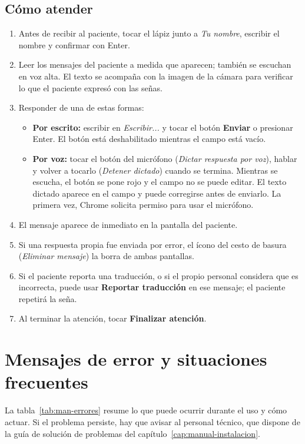 \subsection{Cómo atender}

\begin{enumerate}
  \item Antes de recibir al paciente, tocar el lápiz junto a \emph{Tu nombre}, escribir el nombre y confirmar con Enter.
  \item Leer los mensajes del paciente a medida que aparecen; también se escuchan en voz alta. El texto se acompaña con la imagen de la cámara para verificar lo que el paciente expresó con las señas.
  \item Responder de una de estas formas:
  \begin{itemize}
    \item \textbf{Por escrito:} escribir en \emph{Escribir...} y tocar el botón \textbf{Enviar} o presionar Enter. El botón está deshabilitado mientras el campo está vacío.
    \item \textbf{Por voz:} tocar el botón del micrófono (\emph{Dictar respuesta por voz}), hablar y volver a tocarlo (\emph{Detener dictado}) cuando se termina. Mientras se escucha, el botón se pone rojo y el campo no se puede editar. El texto dictado aparece en el campo y puede corregirse antes de enviarlo. La primera vez, Chrome solicita permiso para usar el micrófono.
  \end{itemize}
  \item El mensaje aparece de inmediato en la pantalla del paciente.
  \item Si una respuesta propia fue enviada por error, el ícono del cesto de basura (\emph{Eliminar mensaje}) la borra de ambas pantallas.
  \item Si el paciente reporta una traducción, o si el propio personal considera que es incorrecta, puede usar \textbf{Reportar traducción} en ese mensaje; el paciente repetirá la seña.
  \item Al terminar la atención, tocar \textbf{Finalizar atención}.
\end{enumerate}

\section{Mensajes de error y situaciones frecuentes}

La tabla~\ref{tab:man-errores} resume lo que puede ocurrir durante el uso y cómo actuar. Si el problema persiste, hay que avisar al personal técnico, que dispone de la guía de solución de problemas del capítulo~\ref{cap:manual-instalacion}.

